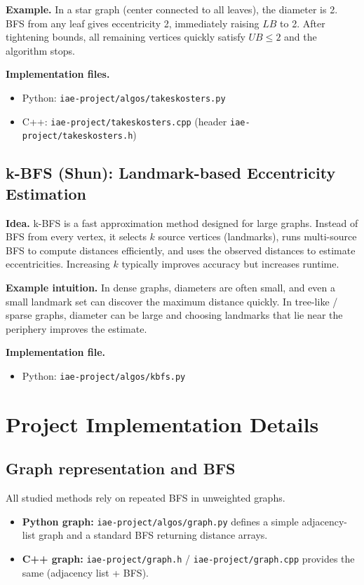 \documentclass[11pt]{article}
\begin{document}
\textbf{Example.} In a star graph (center connected to all leaves), the diameter is 2. BFS from any leaf gives eccentricity 2, immediately raising $LB$ to 2. After tightening bounds, all remaining vertices quickly satisfy $UB\le 2$ and the algorithm stops.

\textbf{Implementation files.}
\begin{itemize}
  \item Python: \texttt{iae-project/algos/takeskosters.py}
  \item C++: \texttt{iae-project/takeskosters.cpp} (header \texttt{iae-project/takeskosters.h})
\end{itemize}

\subsection{k-BFS (Shun): Landmark-based Eccentricity Estimation}

\textbf{Idea.} k-BFS is a fast approximation method designed for large graphs. Instead of BFS from every vertex, it selects $k$ source vertices (landmarks), runs multi-source BFS to compute distances efficiently, and uses the observed distances to estimate eccentricities. Increasing $k$ typically improves accuracy but increases runtime.

\textbf{Example intuition.} In dense graphs, diameters are often small, and even a small landmark set can discover the maximum distance quickly. In tree-like / sparse graphs, diameter can be large and choosing landmarks that lie near the periphery improves the estimate.

\textbf{Implementation file.}
\begin{itemize}
  \item Python: \texttt{iae-project/algos/kbfs.py}
\end{itemize}

\section{Project Implementation Details}

\subsection{Graph representation and BFS}

All studied methods rely on repeated BFS in unweighted graphs.

\begin{itemize}
  \item \textbf{Python graph:} \texttt{iae-project/algos/graph.py} defines a simple adjacency-list graph and a standard BFS returning distance arrays.
  \item \textbf{C++ graph:} \texttt{iae-project/graph.h} / \texttt{iae-project/graph.cpp} provides the same (adjacency list + BFS).
\end{itemize}
\end{document}

